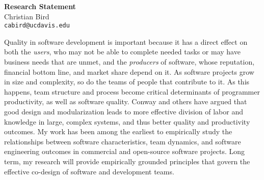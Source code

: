 \documentclass[10pt]{article}
\begin{document}
\thispagestyle{fancy}
\lhead{}
\rhead{}
\renewcommand{\headrulewidth}{0pt} 
\renewcommand{\footrulewidth}{0pt} 


\pagestyle{fancy}

\begin{small}

\begin{center}
{\LARGE \bf Research Statement}\\
\vspace*{0.2cm}
{\large Christian Bird}\\
\vspace*{0cm}
\texttt{\normalsize cabird@ucdavis.edu}
\end{center}



Quality in software development is important because it has
a direct effect on both the \emph{users}, who may not be able
to complete needed tasks or may have business needs that are unmet,
and the \emph{producers} of software, whose reputation, financial
bottom line, and market share depend on it.
As software projects grow in size and complexity, so do the
teams of people that contribute to it.  As this happens, team structure and
process  become critical determinants of programmer productivity, as well as
software quality.  Conway and others have argued that good design and
modularization leads to more effective division of labor and knowledge in
large, complex systems, and thus better quality and productivity outcomes.  My
work has been among the earliest to empirically study the relationships between
software characteristics, team dynamics, and software engineering outcomes in
commercial and open-source software projects.  Long term, my research will
provide empirically grounded  principles that govern the effective co-design of
software and development teams. 



\end{small}
\end{document}
